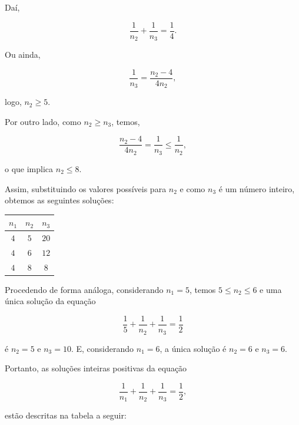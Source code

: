 Daí,

\begin{equation*}
\frac{1}{n_2}+\frac{1}{n_3}=\frac{1}{4}.
\end{equation*}

Ou ainda,

\begin{equation*}
\frac{1}{n_3}=\frac{n_2-4}{4n_2},
\end{equation*}

logo, $n_2\geq5$.

Por outro lado, como $n_2\geq n_3$, temos,

\begin{equation*}
\frac{n_2-4}{4n_2}=\frac{1}{n_3}\leq\frac{1}{n_2},
\end{equation*}

o que implica $n_2\leq8$.

Assim, substituindo os valores possíveis para $n_2$ e como $n_3$ é um número inteiro, obtemos as seguintes soluções:


\begin{table}[H]
\centering
\setlength\tabcolsep{5mm}
\begin{tabu} to \textwidth{|c|c|c|}
\hline
${n_1}$ & ${n_2}$ & ${n_3}$ \\
\hline
$4$ & $5$ & $20$ \\
\hline
$4$ & $6$ & $12$ \\
\hline
$4$ & $8$ & $8$ \\ 
\hline
\end{tabu}
\end{table}

Procedendo de forma análoga, considerando $n_1 = 5$, temos $5\leq n_2 \leq6$ e uma única solução da equação

\begin{equation*}
\frac{1}{5}+\frac{1}{n_2}+\frac{1}{n_3}=\frac{1}{2}
\end{equation*}

é $n_2=5$ e $n_3=10$. E, considerando $n_1=6$, a única solução é $n_2 = 6$ e $n_3=6$.

Portanto, as soluções inteiras positivas da equação

\begin{equation*}
\frac{1}{n_1}+\frac{1}{n_2}+\frac{1}{n_3}=\frac{1}{2},
\end{equation*} 

estão descritas na tabela a seguir:


